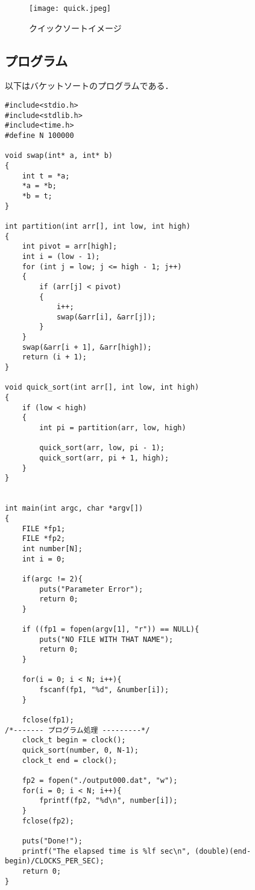 \documentclass[a4j, titlepage]{jarticle}
\begin{document}
\begin{figure}[tbh]
\centering \texttt{[image: quick.jpeg]}
\caption{クイックソートイメージ}
\label{quick}
\end{figure}

\subsection{プログラム}
以下はバケットソートのプログラムである．\vspace{5pt}
\begin{lstlisting}[basicstyle=\ttfamily\footnotesize, frame=trbl]
#include<stdio.h>
#include<stdlib.h>
#include<time.h>
#define N 100000

void swap(int* a, int* b)
{
    int t = *a;
    *a = *b;
    *b = t;
}

int partition(int arr[], int low, int high)
{
    int pivot = arr[high];
    int i = (low - 1); 
    for (int j = low; j <= high - 1; j++)
    {
        if (arr[j] < pivot)
        {
            i++; 
            swap(&arr[i], &arr[j]);
        }
    }
    swap(&arr[i + 1], &arr[high]);
    return (i + 1);
}

void quick_sort(int arr[], int low, int high)
{
    if (low < high)
    {
        int pi = partition(arr, low, high)
        
        quick_sort(arr, low, pi - 1);
        quick_sort(arr, pi + 1, high);
    }
}


int main(int argc, char *argv[])
{
    FILE *fp1;
    FILE *fp2;
    int number[N];
    int i = 0;

    if(argc != 2){                         
        puts("Parameter Error");
        return 0;
    }

    if ((fp1 = fopen(argv[1], "r")) == NULL){
        puts("NO FILE WITH THAT NAME");
        return 0;
    }

    for(i = 0; i < N; i++){
        fscanf(fp1, "%d", &number[i]);
    }

    fclose(fp1);
/*------- プログラム処理 ---------*/
    clock_t begin = clock();
    quick_sort(number, 0, N-1);
    clock_t end = clock();

    fp2 = fopen("./output000.dat", "w");
    for(i = 0; i < N; i++){
        fprintf(fp2, "%d\n", number[i]);
    }
    fclose(fp2);

    puts("Done!");
    printf("The elapsed time is %lf sec\n", (double)(end-begin)/CLOCKS_PER_SEC);
    return 0;
}
\end{lstlisting}
\end{document}

